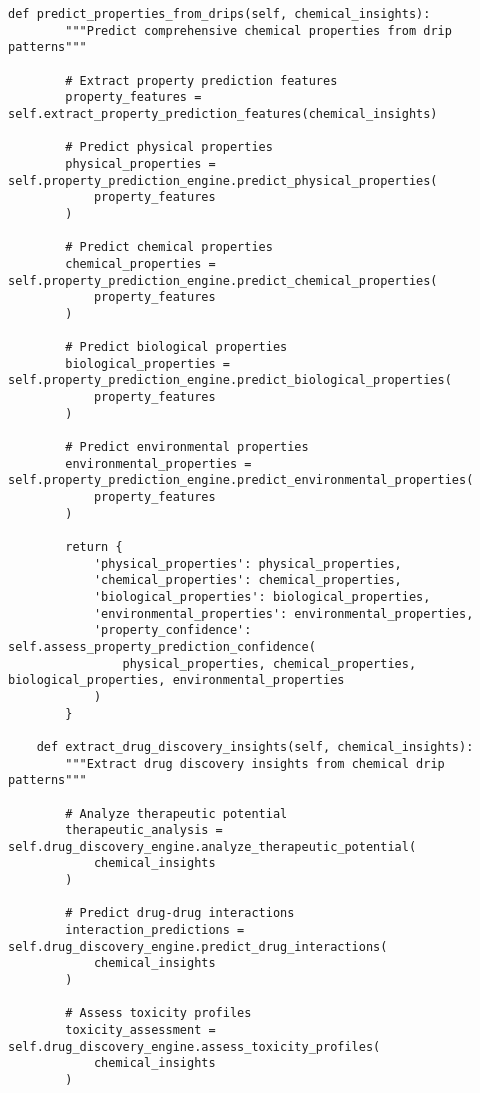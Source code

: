 \documentclass[12pt,a4paper]{article}
\begin{document}
\begin{algorithm}
\begin{algorithmic}[1]
\begin{table}[H]
\begin{lstlisting}[style=pythonstyle, caption=Computer Vision Comprehensive Chemical Pattern Analysis]
    def predict_properties_from_drips(self, chemical_insights):
        """Predict comprehensive chemical properties from drip patterns"""
        
        # Extract property prediction features
        property_features = self.extract_property_prediction_features(chemical_insights)
        
        # Predict physical properties
        physical_properties = self.property_prediction_engine.predict_physical_properties(
            property_features
        )
        
        # Predict chemical properties
        chemical_properties = self.property_prediction_engine.predict_chemical_properties(
            property_features
        )
        
        # Predict biological properties
        biological_properties = self.property_prediction_engine.predict_biological_properties(
            property_features
        )
        
        # Predict environmental properties
        environmental_properties = self.property_prediction_engine.predict_environmental_properties(
            property_features
        )
        
        return {
            'physical_properties': physical_properties,
            'chemical_properties': chemical_properties,
            'biological_properties': biological_properties,
            'environmental_properties': environmental_properties,
            'property_confidence': self.assess_property_prediction_confidence(
                physical_properties, chemical_properties, biological_properties, environmental_properties
            )
        }
    
    def extract_drug_discovery_insights(self, chemical_insights):
        """Extract drug discovery insights from chemical drip patterns"""
        
        # Analyze therapeutic potential
        therapeutic_analysis = self.drug_discovery_engine.analyze_therapeutic_potential(
            chemical_insights
        )
        
        # Predict drug-drug interactions
        interaction_predictions = self.drug_discovery_engine.predict_drug_interactions(
            chemical_insights
        )
        
        # Assess toxicity profiles
        toxicity_assessment = self.drug_discovery_engine.assess_toxicity_profiles(
            chemical_insights
        )
        

\end{lstlisting}
\end{table}
\end{algorithmic}
\end{algorithm}
\end{document}
